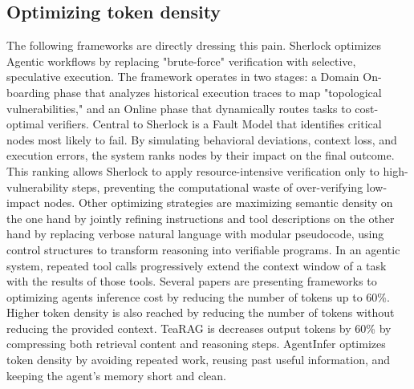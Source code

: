 \documentclass[10pt,twocolumn,letterpaper]{article}
\begin{document}
\subsection{Optimizing token density}
The following frameworks are directly dressing this pain. Sherlock \citep{Ro_2025} optimizes Agentic workflows by replacing "brute-force" verification with selective, speculative execution. The framework operates in two stages: a Domain On-boarding phase that analyzes historical execution traces to map "topological vulnerabilities," and an Online phase that dynamically routes tasks to cost-optimal verifiers. Central to Sherlock is a Fault Model that identifies critical nodes most likely to fail. By simulating behavioral deviations, context loss, and execution errors, the system ranks nodes by their impact on the final outcome. This ranking allows Sherlock to apply resource-intensive verification only to high-vulnerability steps, preventing the computational waste of over-verifying low-impact nodes. Other optimizing strategies \citep{Wu_Meij_Yilmaz_2025, Yang_He_Gao_Cao_Li_Hsu_2025} are maximizing semantic density on the one hand by jointly refining instructions and tool descriptions on the other hand by replacing verbose natural language with modular pseudocode, using control structures to transform reasoning into verifiable programs. In an agentic system, repeated tool calls progressively extend the context window of a task with the results of those tools. Several papers \citep{Xiao_Gao_Peng_Xiong_2025, Gao_Peng_2025, Yang_He_Gao_Cao_Li_Hsu_2025} are presenting frameworks to optimizing agents inference cost by reducing the number of tokens up to 60\%. Higher token density is also reached by reducing the number of tokens without reducing the provided context. TeaRAG \citep{Zhang_Wang_Xu_Zhang_Lyu_Chen_Liu_Xu_Zhao_Gao_et_al._2025} is decreases output tokens by 60\% by compressing both retrieval content and reasoning steps. AgentInfer \citep{Lin_Zhen_Yang_Wang_Liu_Chen_Zhang_Zhou_Li_Chen_et_al} optimizes token density by avoiding repeated work, reusing past useful information, and keeping the agent’s memory short and clean.
\\\\
\end{document}
